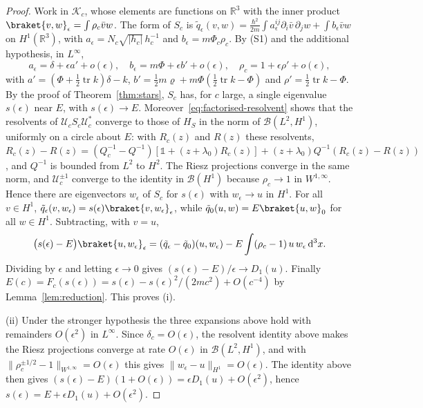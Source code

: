 \documentclass[%
 aip,
 jmp,
 amsmath,amssymb,
 reprint, onecolumn
]{revtex4-1}
\theoremstyle{definition}
\theoremstyle{remark}
\newcommand{\R}{\mathbb{R}}
\newcommand{\K}{\mathcal{K}}
\newcommand{\one}{\mathds{1}}
\newcommand{\rmd}{\mathrm{d}}
\begin{document}
\begin{proof}
Work in $\K_c$, whose elements are functions on $\R^3$ with the inner
product $\braket{v,w}_\epsilon=\int\rho_c\bar vw$. The form of $S_c$ is
$\tilde q_\epsilon(v,w)=\frac{\hbar^2}{2m}\int a^{ij}_\epsilon\partial_i
\bar v\,\partial_jw+\int b_\epsilon\bar vw$ on $H^1(\R^3)$, with
$a_\epsilon=N_c\sqrt{|h_c|}\,h_c^{-1}$ and $b_\epsilon=m\Phi_c\rho_c$. By
(S1) and the additional hypothesis, in $L^\infty$,
\[
a_\epsilon=\delta+\epsilon a'+o(\epsilon),\quad
b_\epsilon=m\Phi+\epsilon b'+o(\epsilon),\quad
\rho_c=1+\epsilon\rho'+o(\epsilon),
\]
with $a'=(\Phi+\frac12\operatorname{tr}k)\delta-k$, $b'=\frac12m\varrho+
m\Phi(\frac12\operatorname{tr}k-\Phi)$ and $\rho'=\frac12
\operatorname{tr}k-\Phi$. By the proof of Theorem~\ref{thm:stars}, $S_c$
has, for $c$ large, a single eigenvalue $s(\epsilon)$ near $E$, with
$s(\epsilon)\to E$. Moreover~\eqref{eq:factorised-resolvent} shows that
the resolvents of $\mathcal{U}_cS_c\mathcal{U}_c^*$ converge to those of
$H_S$ in the norm of $\mathcal{B}(L^2,H^1)$, uniformly on a circle about
$E$: with $R_c(z)$ and $R(z)$ these resolvents,
$R_c(z)-R(z)=(Q_c^{-1}-Q^{-1})[\one+(z+\lambda_0)R_c(z)]+(z+\lambda_0)
Q^{-1}(R_c(z)-R(z))$, and $Q^{-1}$ is bounded from $L^2$ to $H^2$. The
Riesz projections converge in the same norm, and
$\mathcal{U}_c^{\pm1}$ converge to the identity in $\mathcal{B}(H^1)$
because $\rho_c\to1$ in $W^{1,\infty}$. Hence there are eigenvectors
$w_\epsilon$ of $S_c$ for $s(\epsilon)$ with $w_\epsilon\to u$ in $H^1$.
For all $v\in H^1$, $\tilde q_\epsilon(v,w_\epsilon)=s(\epsilon)
\braket{v,w_\epsilon}_\epsilon$, while $\tilde q_0(u,w)=E\braket{u,w}_0$
for all $w\in H^1$. Subtracting, with $v=u$,
\[
\bigl(s(\epsilon)-E\bigr)\braket{u,w_\epsilon}_\epsilon
=(\tilde q_\epsilon-\tilde q_0)(u,w_\epsilon)
-E\int(\rho_c-1)\,u\,w_\epsilon\,\rmd^3x .
\]
Dividing by $\epsilon$ and letting $\epsilon\to0$ gives
$(s(\epsilon)-E)/\epsilon\to D_1(u)$. Finally
$E(c)=F_c(s(\epsilon))=s(\epsilon)-s(\epsilon)^2/(2mc^2)+O(c^{-4})$ by
Lemma~\ref{lem:reduction}. This proves (i).

(ii) Under the stronger hypothesis the three expansions above hold with
remainders $O(\epsilon^2)$ in $L^\infty$. Since $\delta_c=O(\epsilon)$,
the resolvent identity above makes the Riesz projections converge at rate
$O(\epsilon)$ in $\mathcal{B}(L^2,H^1)$, and with
$\|\rho_c^{\pm1/2}-1\|_{W^{1,\infty}}=O(\epsilon)$ this gives
$\|w_\epsilon-u\|_{H^1}=O(\epsilon)$. The
identity above then gives $(s(\epsilon)-E)(1+O(\epsilon))=\epsilon D_1(u)
+O(\epsilon^2)$, hence $s(\epsilon)=E+\epsilon D_1(u)+O(\epsilon^2)$.


\end{proof}
\end{document}
